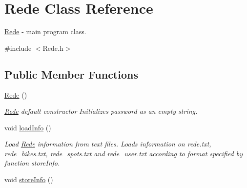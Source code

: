 \hypertarget{class_rede}{\section{Rede Class Reference}
\label{class_rede}
}


\hyperlink{class_rede}{Rede} -\/ main program class.  




{\ttfamily \#include $<$Rede.\+h$>$}

\subsection*{Public Member Functions}
\begin{DoxyCompactItemize}
\item 
\hypertarget{class_rede_a0c0699d33419180c9c0792823964418c}{\hyperlink{class_rede_a0c0699d33419180c9c0792823964418c}{Rede} ()}\label{class_rede_a0c0699d33419180c9c0792823964418c}

\begin{DoxyCompactList}\small\item\em \hyperlink{class_rede}{Rede} default constructor Initializes password as an empty string. \end{DoxyCompactList}\item 
\hypertarget{class_rede_a1751f922073f6172ba676a56959a1540}{void \hyperlink{class_rede_a1751f922073f6172ba676a56959a1540}{load\+Info} ()}\label{class_rede_a1751f922073f6172ba676a56959a1540}

\begin{DoxyCompactList}\small\item\em Load \hyperlink{class_rede}{Rede} information from text files. Loads information on rede.\+txt, rede\+\_\+bikes.\+txt, rede\+\_\+spots.\+txt and rede\+\_\+user.\+txt according to format specified by function store\+Info. \end{DoxyCompactList}\item 
\hypertarget{class_rede_abec1da6660663cd58e6851737219959e}{void \hyperlink{class_rede_abec1da6660663cd58e6851737219959e}{store\+Info} ()}\label{class_rede_abec1da6660663cd58e6851737219959e}


\end{DoxyCompactItemize}

